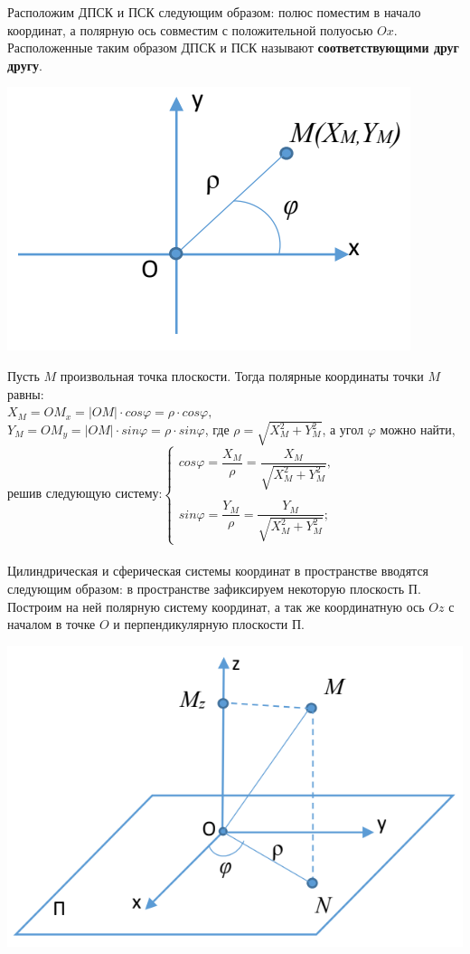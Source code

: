 Расположим ДПСК и ПСК следующим образом: полюс поместим в начало координат, а полярную ось совместим с положительной полуосью $Ox$. Расположенные таким образом ДПСК и ПСК называют \textbf{соответствующими друг другу}.\begin{center}
	\includegraphics[scale=0.4]{images/d_psk.png}
\end{center}
Пусть $M$ произвольная точка плоскости. Тогда полярные координаты точки $M$ равны: \\$X_M = OM_x = |OM|\cdot cos\varphi = \rho\cdot cos\varphi,$\\
$Y_M = OM_y = |OM|\cdot sin\varphi = \rho\cdot sin\varphi$, где $\rho = \sqrt{X_M^2 + Y_M^2}$, а угол $\varphi$ можно найти, решив следующую систему:$\begin{cases}
	cos\varphi = \dfrac{X_M}{\rho} = \dfrac{X_M}{\sqrt{X_M^2 + Y_M^2}},\\\\
	sin\varphi = \dfrac{Y_M}{\rho} = \dfrac{Y_M}{\sqrt{X_M^2 + Y_M^2}};
\end{cases}$\\\\
Цилиндрическая и сферическая системы координат в пространстве вводятся следующим образом: в пространстве зафиксируем некоторую плоскость П. Построим на ней полярную систему координат, а так же координатную ось $Oz$ с началом в точке $O$ и перпендикулярную плоскости П.\begin{center}
	\includegraphics[scale=0.3]{images/pcsk.png}
\end{center}
